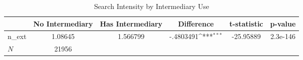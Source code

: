 \begin{table}[htbp]\centering
\def\sym#1{\ifmmode^{#1}\else\(^{#1}\)\fi}
\caption{Search Intensity by Intermediary Use}
\begin{tabular}{l*{1}{ccccc}}
\hline\hline
            &No Intermediary&Has Intermediary&  Difference         & t-statistic&     p-value\\
\hline
n\_ext       &     1.08645&    1.566799&   -.4803491\sym{***}&   -25.95889&    2.3e-146\\
\hline
\(N\)       &       21956&            &                     &            &            \\
\hline\hline
\end{tabular}
\end{table}
